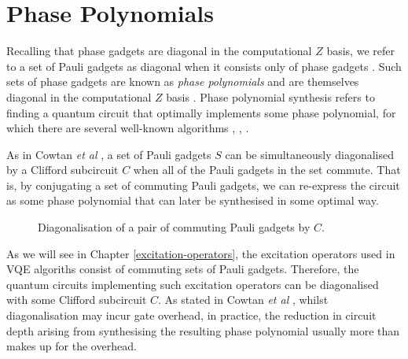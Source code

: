\section{Phase Polynomials}%
\label{phase-polynomials}

Recalling that phase gadgets are diagonal in the computational $Z$ basis, we refer to a set of Pauli gadgets as diagonal when it consists only of phase gadgets \cite{Cowtan2020}. Such sets of phase gadgets are known as \textit{phase polynomials} and are themselves diagonal in the computational $Z$ basis \cite{Cowtan2019}. Phase polynomial synthesis refers to finding a quantum circuit that optimally implements some phase polynomial, for which there are several well-known algorithms \cite{Amy2013}, \cite{Amy2014}, \cite{Nam2018}.

As in Cowtan \textit{et al} \cite{Cowtan2020}, a set of Pauli gadgets $S$ can be simultaneously diagonalised by a Clifford subcircuit $C$ when all of the Pauli gadgets in the set commute. That is, by conjugating a set of commuting Pauli gadgets, we can re-express the circuit as some phase polynomial that can later be synthesised in some optimal way.

\begin{figure}[H]
    \centering
    \caption{Diagonalisation of a pair of commuting Pauli gadgets by $C$.}
\end{figure}

As we will see in Chapter \ref{excitation-operators}, the excitation operators used in VQE algoriths consist of commuting sets of Pauli gadgets. Therefore, the quantum circuits implementing such excitation operators can be diagonalised with some Clifford subcircuit $C$. As stated in Cowtan \textit{et al} \cite{Cowtan2020}, whilst diagonalisation may incur gate overhead, in practice, the reduction in circuit depth arising from synthesising the resulting phase polynomial usually more than makes up for the overhead.
